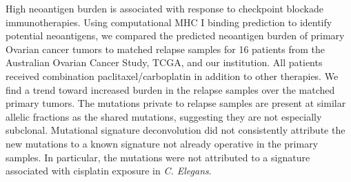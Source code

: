 High neoantigen burden is associated with response to checkpoint blockade immunotherapies. Using computational MHC I binding prediction to identify potential neoantigens, we compared the predicted neoantigen burden of primary Ovarian cancer tumors to matched relapse samples for 16 patients from the Australian Ovarian Cancer Study, TCGA, and our institution. All patients received combination paclitaxel/carboplatin in addition to other therapies. We find a trend toward increased burden in the relapse samples over the matched primary tumors. The mutations private to relapse samples are present at similar allelic fractions as the shared mutations, suggesting they are not especially subclonal. Mutational signature deconvolution did not consistently attribute the new mutations to a known signature not already operative in the primary samples. In particular, the mutations were not attributed to a signature associated with cisplatin exposure in \textit{C. Elegans}.

